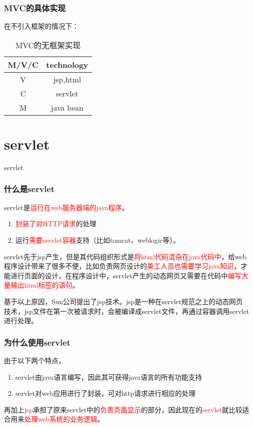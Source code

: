 \documentclass{beamer}
\begin{document}
\begin{frame}
\frametitle{MVC的具体实现}
在不引入框架的情况下：

\begin{table}
\begin{tabular}{cc}
\toprule
\textbf{M/V/C} & \textbf{technology}\\
\midrule
V & jsp,html\\
C & servlet\\
M & java bean\\
\bottomrule
\end{tabular}
\caption{MVC的无框架实现}

\end{table}
\end{frame}
\section{servlet}
\begin{frame}
\Huge{\centerline{servlet}}
\end{frame}
\begin{frame}
\frametitle{什么是servlet}
servlet是\textcolor{red}{运行在web服务器端的java程序}。
\begin{enumerate}
\item
\textcolor{red}{封装了对HTTP请求}的处理
\item
运行\textcolor{red}{需要servlet容器}支持（比如tomcat、weblogic等）。
\end{enumerate}


servlet先于jsp产生，但是其代码组织形式是\textcolor{red}{将html代码混杂在java代码中}，给web程序设计带来了很多不便，比如负责网页设计的\textcolor{red}{美工人员也需要学习java知识}，才能进行页面的设计，在程序设计中，servlet产生的动态网页又需要在代码中\textcolor{red}{编写大量输出html标签的语句}。

基于以上原因，Sun公司提出了jsp技术。jsp是一种在servlet规范之上的动态网页技术，jsp文件在第一次被请求时，会被编译成servlet文件，再通过容器调用servlet进行处理。

\end{frame}
\begin{frame}
\frametitle{为什么使用servlet}
由于以下两个特点，
\begin{enumerate}
\item
servlet由java语言编写，因此其可获得java语言的所有功能支持
\item
servlet对web应用进行了封装，可对http请求进行相应的处理
\end{enumerate}
再加上\textcolor{red}{jsp}承担了原来servlet中的\textcolor{red}{负责页面显示}的部分，因此现在的\textcolor{red}{servlet}就比较适合用来\textcolor{red}{处理web系统的业务逻辑}。
\end{frame}
\end{document}
